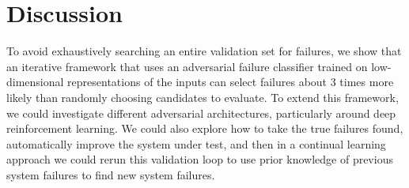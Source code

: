 \section{Discussion}
To avoid exhaustively searching an entire validation set for failures, we show that an iterative framework that uses an adversarial failure classifier trained on low-dimensional representations of the inputs can select failures about $3$ times more likely than randomly choosing candidates to evaluate.
To extend this framework, we could investigate different adversarial architectures, particularly around deep reinforcement learning.
We could also explore how to take the true failures found, automatically improve the system under test, and then in a continual learning approach we could rerun this validation loop to use prior knowledge of previous system failures to find new system failures.
